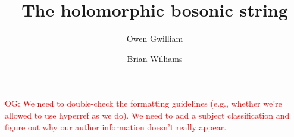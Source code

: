 \documentclass{conm-p-l}
\title{The holomorphic bosonic string}
\author{Owen Gwilliam}
\author{Brian Williams}
\def\owen{\textcolor{red}{OG: }\textcolor{red}}
\begin{document}
\maketitle

\setcounter{tocdepth}{1}

\tableofcontents

\owen{We need to double-check the formatting guidelines (e.g., whether we're allowed to use hyperref as we do). We need to add a subject classification and figure out why our author information doesn't really appear.}













\end{document}
